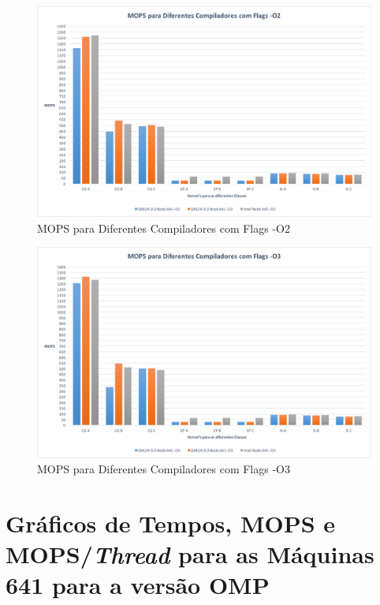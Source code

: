 \documentclass[conference,compsoc]{IEEEtran}
\begin{document}
\begin{figure}[h!]
\centering
\includegraphics[scale=0.325]{SER/mops_dif_comp_O2_nodo_641.png}
\caption{MOPS para Diferentes Compiladores com Flags -O2}
\end{figure}

\begin{figure}[h!]
\centering
\includegraphics[scale=0.325]{SER/mops_dif_comp_O3_nodo_641.png}
\caption{MOPS para Diferentes Compiladores com Flags -O3}
\end{figure}

\section{Gráficos de Tempos, MOPS e MOPS/\textit{Thread} para as Máquinas 641 para a versão OMP}
\label{appendix:641_omp}
\end{document}
